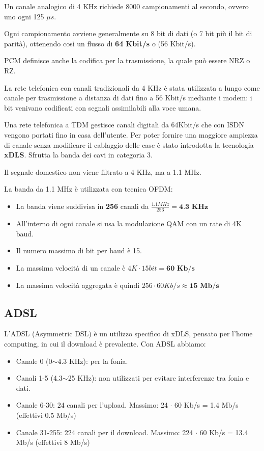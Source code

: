             Un canale analogico di 4 KHz richiede 8000 campionamenti al secondo, ovvero uno ogni 125 $\mu s$.

            Ogni campionamento avviene generalmente su 8 bit di dati (o 7 bit più il bit di parità), ottenendo così un flusso di \textbf{64 Kbit/s} o (56 Kbit/s).

            PCM definisce anche la codifica per la trasmissione, la quale può essere NRZ o RZ.

            La rete telefonica con canali tradizionali da 4 KHz è stata utilizzata a lungo come canale per trasmissione a distanza di dati fino a 56 Kbit/s mediante i modem: i bit venivano codificati con segnali assimilabili alla voce umana.

            Una rete telefonica a TDM gestisce canali digitali da 64Kbit/s che con ISDN vengono portati fino in casa dell'utente. Per poter fornire una maggiore ampiezza di canale senza modificare il cablaggio delle case è stato introdotta la tecnologia \textbf{xDLS}. Sfrutta la banda dei cavi in categoria 3.

            Il segnale domestico non viene filtrato a 4 KHz, ma a 1.1 MHz.

            La banda da 1.1 MHz è utilizzata con tecnica OFDM:
            \begin{itemize}
                \item La banda viene suddivisa in \textbf{256} canali da $\frac{1.1 MHz}{256} = \textbf{4.3 KHz}$
                \item All'interno di ogni canale si usa la modulazione QAM con un rate di 4K baud.
                \item Il numero massimo di bit per baud è 15.
                \item La massima velocità di un canale è $4K \cdot 15 bit = \textbf{60 Kb/s}$
                \item La massima velocità aggregata è quindi $256 \cdot 60Kb/s \approx \textbf{15 Mb/s}$
            \end{itemize}

    \subsection{ADSL}
        L’ADSL (Asymmetric DSL) è un utilizzo specifico di xDLS, pensato per l'home computing, in cui il download è prevalente. Con ADSL abbiamo:
        \begin{itemize}
            \item Canale 0 (0$\sim$4.3 KHz): per la fonia.
            \item Canali 1-5 (4.3$\sim$25 KHz): non utilizzati per evitare interferenze tra fonia e dati.
            \item Canale 6-30: 24 canali per l'upload. Massimo: 24 $\cdot$ 60 Kb/s = 1.4 Mb/s (effettivi 0.5 Mb/s)
            \item Canale 31-255: 224 canali per il download. Massimo: 224 $\cdot$ 60 Kb/s = 13.4 Mb/s (effettivi 8 Mb/s)
        \end{itemize}

